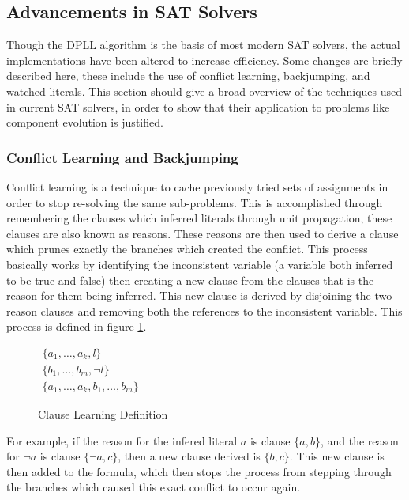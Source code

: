 \subsection{Advancements in SAT Solvers}
Though the DPLL algorithm is the basis of most modern SAT solvers, the actual implementations have been altered to increase efficiency.
Some changes are briefly described here, these include the use of conflict learning, backjumping, and watched literals.
This section should give a broad overview of the techniques used in current SAT solvers, 
in order to show that their application to problems like component evolution is justified. 

\subsubsection{Conflict Learning and Backjumping}
Conflict learning \citep{stallman1976} is a technique to cache previously tried sets of assignments in order to stop re-solving the same sub-problems.
This is accomplished through remembering the clauses which inferred literals through unit propagation, these clauses are also known as reasons.
These reasons are then used to derive a clause which prunes exactly the branches which created the conflict.
This process basically works by identifying the inconsistent variable (a variable both inferred to be true and false) 
then creating a new clause from the clauses that is the reason for them being inferred.
This new clause is derived by disjoining the two reason clauses and removing both the references to the inconsistent variable.
This process is defined in figure \ref{impl.clauselearning}. 

\begin{figure}[htp]
\begin{center}
$\begin{array}{c}
\{a_1,\ldots,a_k, l\} \\
\{b_1,\ldots,b_m,\neg l\}\\
\hline
\{a_1,\ldots,a_k, b_1,\ldots,b_m \}
\end{array}$
  \caption{Clause Learning Definition}
  \label{impl.clauselearning}
\end{center}
\end{figure}

For example, if the reason for the infered literal $a$ is clause $\{a, b\}$, and the reason for $\neg a$ is clause $\{\neg a, c\}$,
then a new clause derived is $\{b,c\}$.
This new clause is then added to the formula, which then stops the process from stepping through the branches which caused this exact conflict to occur again.

